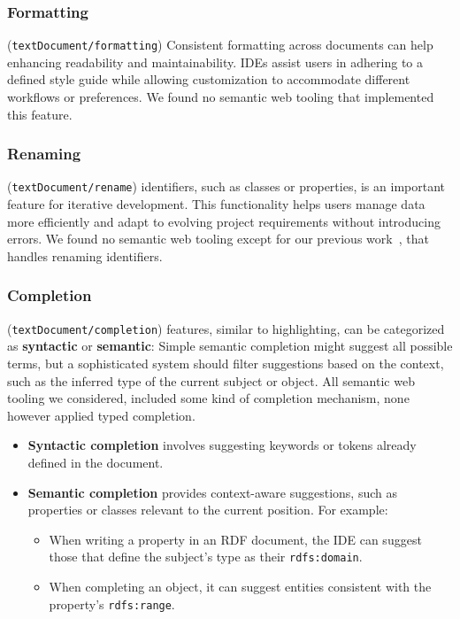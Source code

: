 \subsubsection{Formatting} (\texttt{textDocument/formatting})
Consistent formatting across documents can help enhancing readability and maintainability.
IDEs assist users in adhering to a defined style guide while allowing customization to accommodate different workflows or preferences.
We found no semantic web tooling that implemented this feature.

\subsubsection{Renaming} (\texttt{textDocument/rename}) identifiers, such as classes or properties, is an important feature for iterative development.
This functionality helps users manage data more efficiently and adapt to evolving project requirements without introducing errors.
We found no semantic web tooling except for our previous work~\cite{JSONLD-LSP}, that handles renaming identifiers.

\subsubsection{Completion} (\texttt{textDocument/completion}) features, similar to highlighting, can be categorized as \textbf{syntactic} or \textbf{semantic}:
Simple semantic completion might suggest all possible terms, but a sophisticated system should filter suggestions based on the context, such as the inferred type of the current subject or object.
All semantic web tooling we considered, included some kind of completion mechanism, none however applied typed completion.


\begin{itemize}
    \item \textbf{Syntactic completion} involves suggesting keywords or tokens already defined in the document.
    \item \textbf{Semantic completion} provides context-aware suggestions, such as properties or classes relevant to the current position. For example:
    \begin{itemize}
        \item When writing a property in an RDF document, the IDE can suggest those that define the subject's type as their \texttt{rdfs:domain}.
        \item When completing an object, it can suggest entities consistent with the property's \texttt{rdfs:range}.
    \end{itemize}
\end{itemize}

